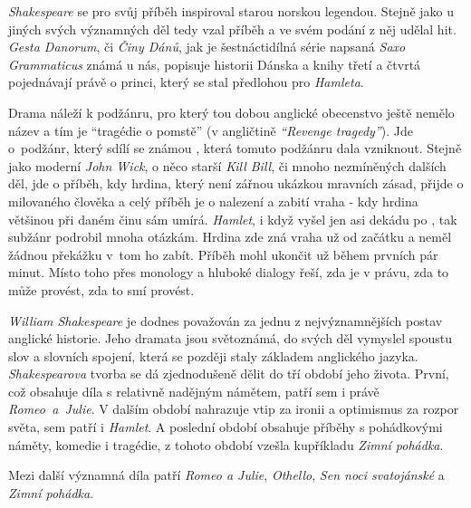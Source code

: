\documentclass[FGBook.tex]{subfiles}
\begin{document}
\noindent
\textit{Shakespeare} se pro svůj příběh inspiroval starou norskou legendou.
Stejně jako u jiných svých významných děl tedy vzal příběh a ve svém podání z něj udělal hit.
\textit{Gesta Danorum}, či \textit{Činy Dánů}, jak je šestnáctidílná série napsaná \textit{Saxo Grammaticus} známá u nás, popisuje historii Dánska a knihy třetí a čtvrtá pojednávají právě o princi, který se stal předlohou pro \textit{Hamleta}.

\noindent
Drama náleží k podžánru, pro který tou dobou anglické obecenstvo ještě nemělo název a tím je \enquote{tragédie o pomstě} (v angličtině \textit{\enquote{Revenge tragedy}}).
Jde o~podžánr, který sdílí se známou , která tomuto podžánru dala vzniknout.
Stejně jako moderní \textit{John Wick}, o něco starší \textit{Kill Bill}, či mnoho nezmíněných dalších děl, jde o příběh, kdy hrdina, který není zářnou ukázkou mravních zásad, přijde o milovaného člověka a celý příběh je o nalezení a zabití vraha - kdy hrdina většinou při daném činu sám umírá.
\textit{Hamlet}, i když vyšel jen asi dekádu po , tak subžánr podrobil mnoha otázkám.
Hrdina zde zná vraha už od začátku a neměl žádnou překážku v~tom ho zabít.
Příběh mohl ukončit už během prvních pár minut.
Místo toho přes monology a hluboké dialogy řeší, zda je v právu, zda to může provést, zda to smí provést.



\noindent 
\textit{William Shakespeare} je dodnes považován za jednu z nejvýznamnějších postav anglické historie.
Jeho dramata jsou světoznámá, do svých děl vymyslel spoustu slov a slovních spojení, která se později staly základem anglického jazyka. \\
\textit{Shakespearova} tvorba se dá zjednodušeně dělit do tří období jeho života.
První, což obsahuje díla s relativně nadějným námětem, patří sem i právě \textit{Romeo~a~Julie}.
V dalším období nahrazuje vtip za ironii a optimismus za rozpor světa, sem patří i \textit{Hamlet}.
A poslední období obsahuje příběhy s pohádkovými náměty, komedie i tragédie, z tohoto období vzešla kupříkladu \textit{Zimní pohádka}.

\noindent 
Mezi další významná díla patří \textit{Romeo a Julie}, \textit{Othello}, \textit{Sen noci svatojánské} a \textit{Zimní pohádka}.
\end{document}
